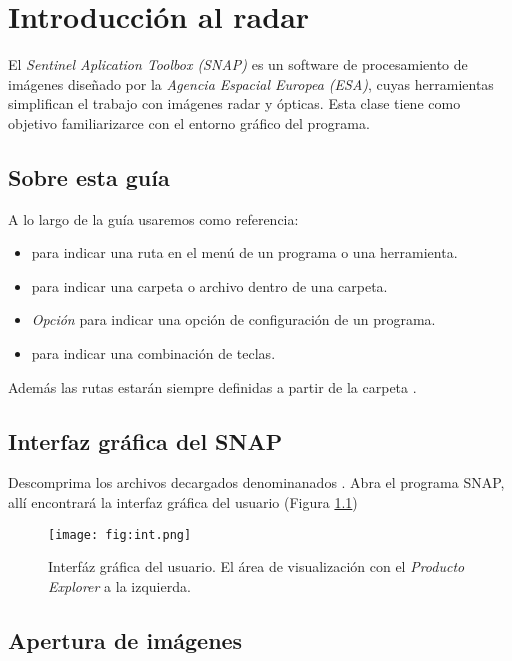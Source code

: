 \chapter{Introducción al radar}

El \emph{Sentinel Aplication Toolbox (SNAP)} es un  software de procesamiento de imágenes diseñado por la \emph{Agencia Espacial Europea (ESA)}, cuyas herramientas simplifican el trabajo con imágenes radar y ópticas.
Esta clase tiene como objetivo familiarizarce con el entorno gráfico del programa.

\section{Sobre esta guía}

A lo largo de la guía usaremos como referencia:

\begin{itemize}
  \item {} para indicar una ruta en el menú de un programa o una herramienta.
  \item {} para indicar una carpeta o archivo dentro de una carpeta.
  \item \emph{Opción} para indicar una opción de configuración de un programa.
  \item {} para indicar una combinación de teclas.
\end{itemize}

Además las rutas estarán siempre definidas a partir de la carpeta .

\section{Interfaz gráfica del SNAP}

Descomprima los archivos decargados denominanados . Abra el programa SNAP, allí encontrará la interfaz gráfica del usuario (Figura \ref{fig:int})

\begin{figure}[h!]
    \centering
    \texttt{[image: fig:int.png]}
    \caption{Interfáz gráfica del usuario. El área de visualización con el \emph{Producto Explorer} a la izquierda.}
    \label{fig:int}
\end{figure}

\section{Apertura de imágenes}

